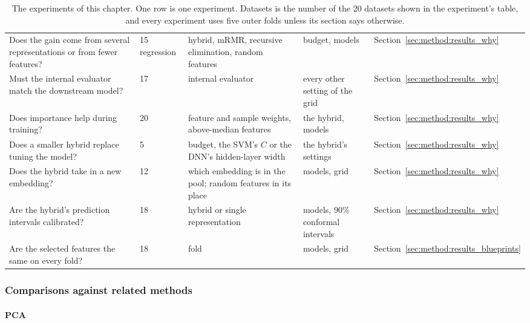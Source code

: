\begin{table}[htbp]
\begin{adjustbox}{max width=\textwidth,max totalheight=0.85\textheight}
\begin{tabular}{@{}P{3.2cm}P{2.2cm}P{3.2cm}P{3.0cm}P{2.1cm}@{}}
Does the gain come from several representations or from fewer features? & 15 regression & hybrid, mRMR, recursive elimination, random features & budget, models & Section~\ref{sec:method:results_why} \\
Must the internal evaluator match the downstream model? & 17 & internal evaluator & every other setting of the grid & Section~\ref{sec:method:results_why} \\
Does importance help during training? & 20 & feature and sample weights, above-median features & the hybrid, models & Section~\ref{sec:method:results_why} \\
Does a smaller hybrid replace tuning the model? & 5 & budget, the SVM's $C$ or the DNN's hidden-layer width & the hybrid's settings & Section~\ref{sec:method:results_why} \\
Does the hybrid take in a new embedding? & 12 & which embedding is in the pool; random features in its place & models, grid & Section~\ref{sec:method:results_why} \\
Are the hybrid's prediction intervals calibrated? & 18 & hybrid or single representation & models, 90\% conformal intervals & Section~\ref{sec:method:results_why} \\
Are the selected features the same on every fold? & 18 & fold & models, grid & Section~\ref{sec:method:results_blueprints} \\
\bottomrule
\end{tabular}
\end{adjustbox}
\caption[Experiment register for the hybrid experiments.]{The experiments of this chapter. One row is one experiment. Datasets is the number of the 20 datasets shown in the experiment's table, and every experiment uses five outer folds unless its section says otherwise.}
\label{tab:experiment_register}
\end{table}

\subsubsection{Comparisons against related methods}

\paragraph{PCA}


